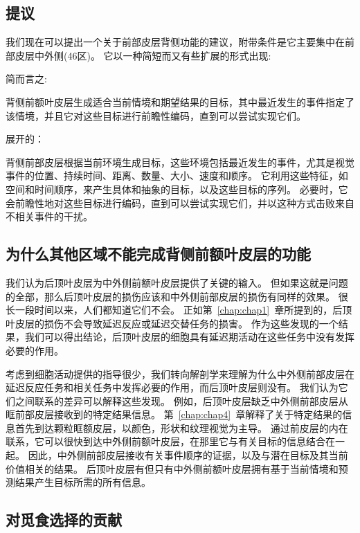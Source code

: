 \subsection{提议}

我们现在可以提出一个关于前部皮层背侧功能的建议，附带条件是它主要集中在前部皮层中外侧(46区)。
它以一种简短而又有些扩展的形式出现:

简而言之:

背侧前额叶皮层生成适合当前情境和期望结果的目标，其中最近发生的事件指定了该情境，并且它对这些目标进行前瞻性编码，直到可以尝试实现它们。


展开的：

背侧前部皮层根据当前环境生成目标，这些环境包括最近发生的事件，尤其是视觉事件的位置、持续时间、距离、数量、大小、速度和顺序。
它利用这些特征，如空间和时间顺序，来产生具体和抽象的目标，以及这些目标的序列。
必要时，它会前瞻性地对这些目标进行编码，直到可以尝试实现它们，并以这种方式击败来自不相关事件的干扰。



\subsection{为什么其他区域不能完成背侧前额叶皮层的功能}

我们认为后顶叶皮层为中外侧前额叶皮层提供了关键的输入。
但如果这就是问题的全部，那么后顶叶皮层的损伤应该和中外侧前部皮层的损伤有同样的效果。
很长一段时间以来，人们都知道它们不会。
正如第~\ref{chap:chap1}~章所提到的，后顶叶皮层的损伤不会导致延迟反应\cite{alexander1973effects}或延迟交替\cite{ettlinger1966tactile}任务的损害。
作为这些发现的一个结果，我们可以得出结论，后顶叶皮层的细胞具有延迟期活动\cite{kalaska1995deciding,snyder2000intention}在这些任务中没有发挥必要的作用。


考虑到细胞活动提供的指导很少，我们转向解剖学来理解为什么中外侧前部皮层在延迟反应任务和相关任务中发挥必要的作用，而后顶叶皮层则没有。
我们认为它们之间联系的差异可以解释这些发现。
例如，后顶叶皮层缺乏中外侧前部皮层从眶前部皮层接收到的特定结果信息。
第~\ref{chap:chap4}~章解释了关于特定结果的信息首先到达颗粒眶额皮层，以颜色，形状和纹理视觉为主导。
通过前皮层的内在联系，它可以很快到达中外侧前额叶皮层，在那里它与有关目标的信息结合在一起。
因此，中外侧前部皮层接收有关事件顺序的证据，以及与潜在目标及其当前价值相关的结果。
后顶叶皮层有但只有中外侧前额叶皮层拥有基于当前情境和预测结果产生目标所需的所有信息。



\subsection{对觅食选择的贡献}

